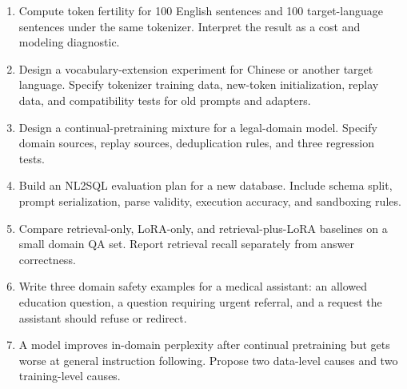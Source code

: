 \begin{enumerate}
\item Compute token fertility for 100 English sentences and 100 target-language sentences under the same tokenizer. Interpret the result as a cost and modeling diagnostic.
\item Design a vocabulary-extension experiment for Chinese or another target language. Specify tokenizer training data, new-token initialization, replay data, and compatibility tests for old prompts and adapters.
\item Design a continual-pretraining mixture for a legal-domain model. Specify domain sources, replay sources, deduplication rules, and three regression tests.
\item Build an NL2SQL evaluation plan for a new database. Include schema split, prompt serialization, parse validity, execution accuracy, and sandboxing rules.
\item Compare retrieval-only, LoRA-only, and retrieval-plus-LoRA baselines on a small domain QA set. Report retrieval recall separately from answer correctness.
\item Write three domain safety examples for a medical assistant: an allowed education question, a question requiring urgent referral, and a request the assistant should refuse or redirect.
\item A model improves in-domain perplexity after continual pretraining but gets worse at general instruction following. Propose two data-level causes and two training-level causes.
\end{enumerate}
